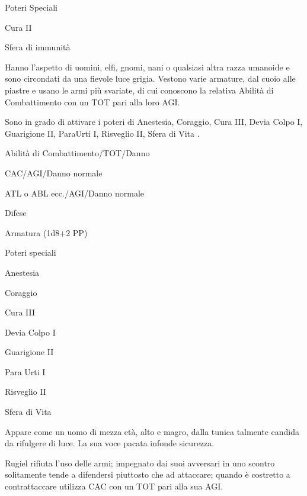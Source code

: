 \begin{parmostro}{Poteri Speciali} 
\item Cura II 
\item Sfera di immunit\`a
\end{parmostro}


Hanno l'aspetto di uomini, elfi, gnomi, nani o qualsiasi altra razza umanoide
e sono circondati da una fievole luce grigia. Vestono varie armature, dal cuoio
alle piastre e usano le armi pi\`u svariate, di cui conoscono la relativa
Abilit\`a di Combattimento con un TOT pari alla loro AGI. 

Sono in grado di
attivare i poteri di Anestesia, Coraggio, Cura III, Devia Colpo I, Guarigione
II, ParaUrti I, Risveglio II, Sfera di Vita . 




\begin{parmostro}{Abilit\`a di Combattimento/TOT/Danno}
\item CAC/AGI/Danno normale
\item  ATL o ABL ecc./AGI/Danno normale
\end{parmostro}


\begin{parmostro}{Difese} 
\item Armatura (1d8+2 PP)
\end{parmostro}

\begin{parmostro}{Poteri speciali}
\item Anestesia
\item Coraggio
\item Cura III
\item Devia Colpo I
\item Guarigione II
\item Para Urti I
\item Risveglio II
\item Sfera di Vita
\end{parmostro}


Appare come un uomo di mezza et\`a, alto e magro, dalla tunica talmente candida
da rifulgere di luce. La sua voce pacata infonde sicurezza. 

Rugiel rifiuta l'uso
delle armi; impegnato dai suoi avversari in uno scontro solitamente tende a
difendersi piuttosto che ad attaccare; quando \`e costretto a contrattaccare
utilizza CAC con un TOT pari alla sua AGI. 

